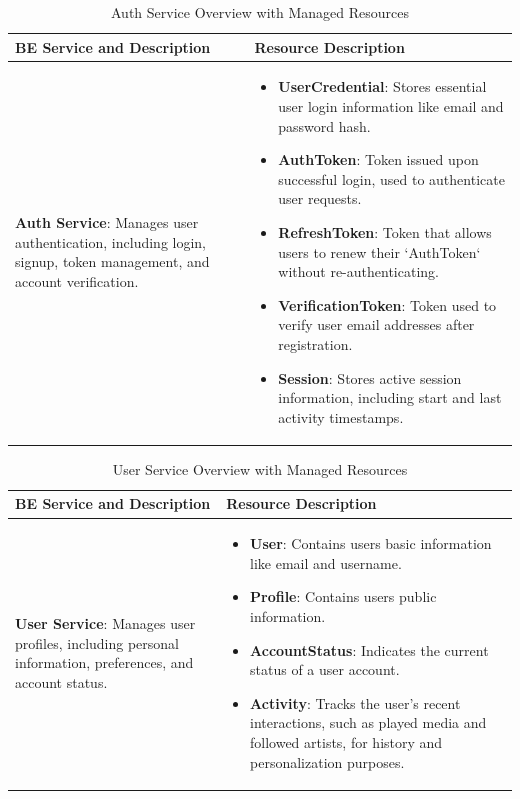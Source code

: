 \documentclass[a4paper,12pt]{article}
\begin{document}
\begin{table}[H]
    \centering
    \renewcommand\arraystretch{1.5}
    \setlength{\tabcolsep}{5pt}
    \begin{tabular}{|>{\centering\arraybackslash}m{4cm}|m{10cm}|}
    \hline
    \textbf{BE Service and Description} & \textbf{Resource Description} \\
    \hline
    \textbf{Auth Service}: Manages user authentication, including login, signup, token management, and account verification. &
    \begin{itemize}[left=0pt]
        \item \textbf{UserCredential}: Stores essential user login information like email and password hash.  
        \item \textbf{AuthToken}: Token issued upon successful login, used to authenticate user requests.  
        \item \textbf{RefreshToken}: Token that allows users to renew their `AuthToken` without re-authenticating.  
        \item \textbf{VerificationToken}: Token used to verify user email addresses after registration. 
        \item \textbf{Session}: Stores active session information, including start and last activity timestamps.
    \end{itemize} \\
    \hline
    \end{tabular}
    \caption{Auth Service Overview with Managed Resources}
    \label{tab:auth-service}
\end{table}

\begin{table}[H]
    \centering
    \renewcommand{\arraystretch}{1.5}
    \begin{tabular}{|>{\centering\arraybackslash}m{4cm}|m{10cm}|}
    \hline
    \textbf{BE Service and Description} & \textbf{Resource Description} \\
    \hline
    \textbf{User Service}: Manages user profiles, including personal information, preferences, and account status. & 
    \begin{itemize}[left=0pt]
        \item \textbf{User}: Contains users basic information like email and username.
        \item \textbf{Profile}: Contains users public information.
        \item \textbf{AccountStatus}: Indicates the current status of a user account.
        \item \textbf{Activity}: Tracks the user's recent interactions, such as played media and followed artists, for history and personalization purposes.
    \end{itemize} \\
    \hline
    \end{tabular}
    \caption{User Service Overview with Managed Resources}
    \label{tab:user-service}
\end{table}
\end{document}
